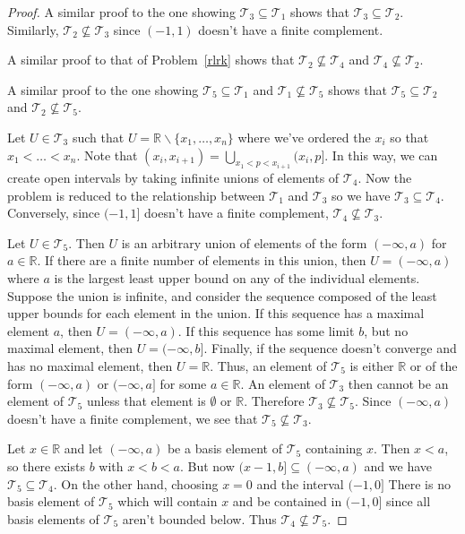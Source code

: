 \documentclass{article}
\begin{document}
\begin{proof}
A similar proof to the one showing $\mathcal{T}_3 \subseteq \mathcal{T}_1$ shows that $\mathcal{T}_3 \subseteq \mathcal{T}_2$. Similarly, $\mathcal{T}_2 \nsubseteq \mathcal{T}_3$ since $(-1,1)$ doesn't have a finite complement.

A similar proof to that of Problem~\ref{rlrk} shows that $\mathcal{T}_2 \nsubseteq \mathcal{T}_4$ and $\mathcal{T}_4 \nsubseteq \mathcal{T}_2$.

A similar proof to the one showing $\mathcal{T}_5 \subseteq \mathcal{T}_1$ and $\mathcal{T}_1 \nsubseteq \mathcal{T}_5$ shows that $\mathcal{T}_5 \subseteq \mathcal{T}_2$ and $\mathcal{T}_2 \nsubseteq \mathcal{T}_5$.

Let $U \in \mathcal{T}_3$ such that $U = \mathbb{R} \backslash \{x_1, \dots , x_n\}$ where we've ordered the $x_i$ so that $x_1 < \dots < x_n$. Note that $(x_i,x_{i+1}) =  \bigcup_{x_1<p<x_{i+1}} (x_i,p]$. In this way, we can create open intervals by taking infinite unions of elements of $\mathcal{T}_4$. Now the problem is reduced to the relationship between $\mathcal{T}_1$ and $\mathcal{T}_3$ so we have $\mathcal{T}_3 \subseteq \mathcal{T}_4$. Conversely, since $(-1,1]$ doesn't have a finite complement, $\mathcal{T}_4 \nsubseteq \mathcal{T}_3$.

Let $U \in \mathcal{T}_5$. Then $U$ is an arbitrary union of elements of the form $(-\infty, a)$ for $a \in \mathbb{R}$. If there are a finite number of elements in this union, then $U = (-\infty, a)$ where $a$ is the largest least upper bound on any of the individual elements. Suppose the union is infinite, and consider the sequence composed of the least upper bounds for each element in the union. If this sequence has a maximal element $a$, then $U = (-\infty, a)$. If this sequence has some limit $b$, but no maximal element, then $U = (-\infty, b]$. Finally, if the sequence doesn't converge and has no maximal element, then $U = \mathbb{R}$. Thus, an element of $\mathcal{T}_5$ is either $\mathbb{R}$ or of the form $(-\infty,a)$ or $(-\infty, a]$ for some $a \in \mathbb{R}$. An element of $\mathcal{T}_3$ then cannot be an element of $\mathcal{T}_5$ unless that element is $\emptyset$ or $\mathbb{R}$. Therefore $\mathcal{T}_3 \nsubseteq \mathcal{T}_5$. Since $(-\infty,a)$ doesn't have a finite complement, we see that $\mathcal{T}_5 \nsubseteq \mathcal{T}_3$.

Let $x \in \mathbb{R}$ and let $(-\infty,a)$ be a basis element of $\mathcal{T}_5$ containing $x$. Then $x < a$, so there exists $b$ with $x < b < a$. But now $(x-1,b] \subseteq (-\infty, a)$ and we have $\mathcal{T}_5 \subseteq \mathcal{T}_4$. On the other hand, choosing $x = 0$ and the interval $(-1,0]$ There is no basis element of $\mathcal{T}_5$ which will contain $x$ and be contained in $(-1,0]$ since all basis elements of $\mathcal{T}_5$ aren't bounded below. Thus $\mathcal{T}_4 \nsubseteq \mathcal{T}_5$.


\end{proof}
\end{document}
